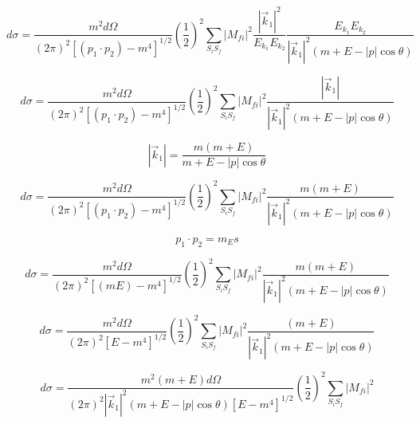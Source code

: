 \documentclass[a4]{article}
\begin{document}
    \begin{equation}
        d \sigma = \frac{m^2 d \Omega}{(2 \pi)^2 [(p_1 \cdot p_2) - m^4]^{1/2}} (\frac{1}{2})^2 \sum_{S_i S_f} |M_{fi}|^2 \frac{|\vec{k}_1|^2}{E_{k_1} E_{k_2}} \frac{E_{k_1} E_{k_2}}{|\vec{k}_1|^2 (m + E - |p| \cos \theta)}
    \end{equation}

    \begin{equation}
        d \sigma = \frac{m^2 d \Omega}{(2 \pi)^2 [(p_1 \cdot p_2) - m^4]^{1/2}} (\frac{1}{2})^2 \sum_{S_i S_f} |M_{fi}|^2 \frac{|\vec{k}_1|}{|\vec{k}_1|^2 (m + E - |p| \cos \theta)}
    \end{equation}

    \begin{equation}
        |\vec{k}_1| = \frac{m (m + E)}{m + E - |p| \cos \theta}
    \end{equation}

    \begin{equation}
        d \sigma = \frac{m^2 d \Omega}{(2 \pi)^2 [(p_1 \cdot p_2) - m^4]^{1/2}} (\frac{1}{2})^2 \sum_{S_i S_f} |M_{fi}|^2 \frac{m (m + E)}{|\vec{k}_1|^2 (m + E - |p| \cos \theta)}
    \end{equation}

    \[
        p_1 \cdot p_2 = m_Es
    \]

    \begin{equation}
        d \sigma = \frac{m^2 d \Omega}{(2 \pi)^2 [(m E) - m^4]^{1/2}} (\frac{1}{2})^2 \sum_{S_i S_f} |M_{fi}|^2 \frac{m (m + E)}{|\vec{k}_1|^2 (m + E - |p| \cos \theta)}
    \end{equation}

    \begin{equation}
        d \sigma = \frac{m^2 d \Omega}{(2 \pi)^2 [E - m^4]^{1/2}} (\frac{1}{2})^2 \sum_{S_i S_f} |M_{fi}|^2 \frac{(m + E)}{|\vec{k}_1|^2 (m + E - |p| \cos \theta)}
    \end{equation}

    \begin{equation}
        d \sigma = \frac{m^2 (m + E) d \Omega}{(2 \pi)^2 |\vec{k}_1|^2 (m + E - |p| \cos \theta) [E - m^4]^{1/2}} (\frac{1}{2})^2 \sum_{S_i S_f} |M_{fi}|^2
    \end{equation}

    \begin{center}
    \end{center}
\end{document}
